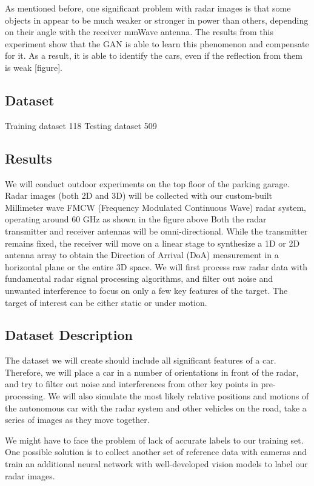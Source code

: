 As mentioned before, one significant problem with radar images is that some objects in appear to be much weaker or stronger in power than others, depending on their angle with the receiver mmWave antenna. The results from this experiment show that the GAN is able to learn this phenomenon and compensate for it. As a result, it is able to identify the cars, even if the reflection from them is weak [figure]. 
\subsection{}

\subsection{Dataset}
Training dataset 118 
Testing dataset 509

\subsection{Results}


\iffalse
We will conduct outdoor experiments on the top floor of the parking garage. Radar images (both 2D and 3D) will be collected with our custom-built Millimeter wave FMCW (Frequency Modulated Continuous Wave) radar system, operating around 60 GHz as shown in the figure above Both the radar transmitter and receiver antennas will be omni-directional. While the transmitter remains fixed, the receiver will move on a linear stage to synthesize a 1D or 2D antenna array to obtain the Direction of Arrival (DoA) measurement in a horizontal plane or the entire 3D space. We will first process raw radar data with fundamental radar signal processing algorithms, and filter out noise and unwanted interference to focus on only a few key features of the target. The target of interest can be either static or under motion. 

\subsection{Dataset Description}
The dataset we will create should include all significant features of a car. Therefore, we will place a car in a number of orientations in front of the radar, and try to filter out noise and interferences from other key points in pre-processing. We will also simulate the most likely relative positions and motions of the autonomous car with the radar system and other vehicles on the road, take a series of images as they move together.
\par We might have to face the problem of lack of accurate labels to our training set. One possible solution is to collect another set of reference data with cameras and train an additional neural network with well-developed vision models to label our radar images.

